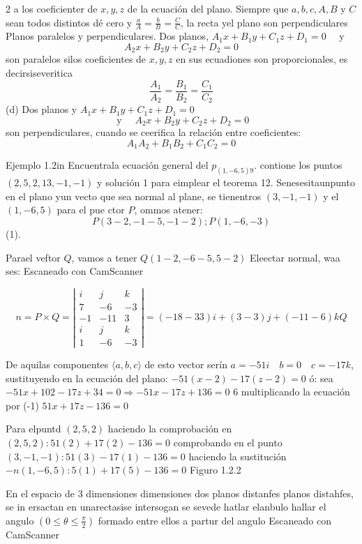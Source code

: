 

2 a los coeficienter de $x, y, z$ de la ecuación del plano. Siempre que $a, b, c, A, B$ y $C$ sean todos distintos dé cero y $\frac{a}{A}=\frac{b}{B}=\frac{C}{C}$, la recta yel plano son perpendiculares
Planos paralelos y perpendiculares.
Dos planos, $A_1 x+B_1 y+C_1 z+D_1=0 \quad$ y
$$
A_2 x+B_2 y+C_2 z+D_2=0
$$
son paralelos silos coeficientes de $x, y, z$ en sus ecuadiones son proporcionales, es decirsiseveritica
$$
\frac{A_1}{A_2}=\frac{B_1}{B_2}=\frac{C_1}{C_2}
$$
(d) Dos planos y $A_1 x+B_1 y+C_1 z+D_1=0$
$$
\text { y } \quad A_2 x+B_2 y+C_2 z+D_2=0
$$
son perpendiculares, cuando se ceerifica la relación entre coeficientes:
$$
A_1 A_2+B_1 B_2+C_1 C_2=0
$$

Ejemplo 1.2in Encuentrala ecuación general del $p_{(1,-6,5) 9}$. contione los puntos $(2,5,2,13,-1,-1)$ y solución 1 para eimplear el teorema 12. Senesesitaunpunto en el plano yun vecto que sea normal al plane, se tienentros $(3,-1,-1)$ y el $(1,-6,5)$ para el pue ctor $P$, ommos atener:
$$
P(3-2,-1-5,-1-2) ; P(1,-6,-3)
$$
(1).

Parael veftor $Q$, vamos a tener $Q(1-2,-6-5,5-2)$ Eleectar normal, waa ses:
Escaneado con CamScanner




$$
n=P \times Q=\left|\begin{array}{ccc}
	i & j & k \\
	7 & -6 & -3 \\
	-1 & -11 & 3 \\
	i & j & k \\
	1 & -6 & -3
\end{array}\right|=(-18-33) i+(3-3) j+(-11-6) k Q
$$

De aquilas componentes $\langle a, b, c\rangle$ de esto vector serín $a=-51 i \quad b=0 \quad c=-17 k$, sustituyendo en la ecuación del plano: $-51(x-2)-17(z-2)=0$ ó: sea $-51 x+102-17 z+34=0 \Rightarrow-51 x-17 z+136=0$ 6 multiplicando la ecuación por (-1) $51 x+17 z-136=0$

Para elpuntd
$(2,5,2)$
haciendo la comprobación en $(2,5,2): 51(2)+17(2)-136=0$ comprobando en el punto $(3,-1,-1): 51(3)-17(1)-136=0$ haciendo la sustitución $-n(1,-6,5): 5(1)+17(5)-136=0$ Figuro 1.2.2

En el espacio de 3
dimensiones dimensiones dos
planos distanfes planos distahfes, se in ersactan en unarectasise intersogan se sevede
hatlar elanbulo hallar el angulo $\left(0 \leq \theta \leq \frac{\pi}{2}\right)$ formado entre ellos a partur del angulo
Escaneado con CamScanner


